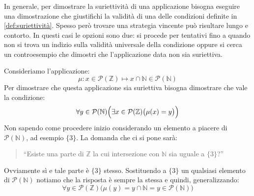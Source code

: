 \begin{example}
\begin{center}
\begin{minipage}{.45\textwidth}
			\label{fig:suriettiva2}
		\end{minipage}
	\end{center}
\end{example}

In generale, per dimostrare la suriettività di una applicazione bisogna eseguire una dimostrazione che giustifichi la validità di una delle condizioni definite in \ref{def:suriettività}. Spesso però trovare una strategia vincente può risultare lungo e contorto. In questi casi le opzioni sono due: si procede per tentativi fino a quando non si trova un indizio sulla validità universale della condizione oppure si cerca un controesempio che dimostri che l'applicazione data non sia suriettiva.

\begin{example}
	Consideriamo l'applicazione:
	\begin{displaymath}
		\mu : x \in \mathcal{P}(\mathbb{Z}) \mapsto x \cap \mathbb{N} \in \mathcal{P}(\mathbb{N})
	\end{displaymath}
	Per dimostrare che questa applicazione sia suriettiva bisogna dimostrare che vale la condizione:
	\begin{equation}
		\forall y \in \mathcal{P}(\mathbb{N}) \Bigl(\exists x \in \mathcal{P}(\mathbb{Z}) \bigl( \mu(x) = y \bigr)\Bigr)
	\end{equation}
	Non sapendo come procedere inizio considerando un elemento a piacere di $\mathcal{P}(\mathbb{N})$, ad esempio $\{3\}$. La domanda che ci si pone sarà:
	\begin{quote}
		``Esiste una parte di $\mathbb{Z}$ la cui intersezione con $\mathbb{N}$ sia uguale a $\{3\}$?''
	\end{quote}
	Ovviamente sì e tale parte è $\{3\}$ stesso. Sostituendo a $\{3\}$ un qualsiasi elemento di $\mathcal{P}(\mathbb{N})$ notiamo che la risposta è sempre la stessa e quindi, generalizzando:
	\begin{displaymath}
		\forall y \in \mathcal{P}(\mathbb{Z}) \bigl( \mu(y)=y \cap \mathbb{N} = y \in \mathcal{P}(\mathbb{N}) \bigr)
	\end{displaymath}
\end{example}

